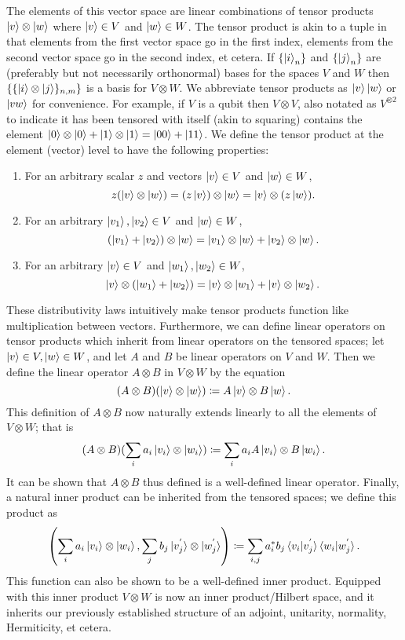 \documentclass[12pt,twoside]{reedthesis}
\theoremstyle{plain}   %
\theoremstyle{definition}
\theoremstyle{remark}
\numberwithin{equation}{section}
\begin{document}
  The elements of this vector space are linear combinations of tensor products $\ket{v} \otimes \ket{w}$
  where $\ket{v} \in V$ and $\ket{w} \in W$.
  The tensor product is akin to a tuple in that elements from the first vector space go in the first index, elements from the second vector space go in the second index, et cetera.
  If $\{\ket{i}_n \}$ and $\{\ket{j}_n \}$ are (preferably but not necessarily orthonormal) bases for the spaces $V$ and $W$ then $\{\{ \ket{i} \otimes \ket{j} \}_{n, m}\}$ is a basis for $V \otimes W$.
  We abbreviate tensor products as $\ket{v} \ket{w}$ or $\ket{vw}$ for convenience.
  For example, if $V$ is a qubit then $V \otimes V$, also notated as $V^{\otimes 2}$ to indicate it has been tensored with itself (akin to squaring) contains the element
  $\ket{0} \otimes \ket{0} + \ket{1} \otimes \ket{1} = \ket{0 0} + \ket{1 1}$.
  We define the tensor product at the element (vector) level to have the following properties:
  \begin{enumerate}
  \item For an arbitrary scalar $z$ and vectors $\ket{v} \in V$ and $\ket{w} \in W$,
    \[ z ( \ket{v} \otimes \ket{w}) = (z \ket{v}) \otimes \ket{w} = \ket{v} \otimes (z \ket{w }).\]

  \item
    For an arbitrary $\ket{v_1}, \ket{v_2} \in V$ and $\ket{w} \in W$,
    \[ (\ket{v_1} + \ket{v_2}) \otimes \ket{w} = \ket{v_1}  \otimes \ket{w} + \ket{v_2} \otimes \ket{w}. \]
  \item
    For an arbitrary $\ket{v} \in V$ and $\ket{w_1}, \ket{w_2} \in W$,
    \[ \ket{v} \otimes (\ket{w_1} + \ket{w_2})  = \ket{v}  \otimes \ket{w_1} + \ket{v} \otimes \ket{w_2}. \]
  \end{enumerate}
  These distributivity laws intuitively make tensor products function like multiplication between vectors.
  Furthermore, we can define linear operators on tensor products which inherit from linear operators on the tensored spaces;
  let $\ket{v} \in V, \ket{w} \in W$, and let $A$ and $B$ be linear operators on $V$ and $W$.
  Then we define the linear operator $A \otimes B$ in $V \otimes W$ by the equation
  \[(A \otimes B) (\ket{v} \otimes \ket{w}) \coloneq A  \ket{v} \otimes B \ket{w}.\]
  This definition of $A \otimes B$ now naturally extends linearly to all the elements of $V \otimes W$; that is
  \[(A \otimes B) (\sum_i a_i \ket{v_i} \otimes \ket{w_i}) \coloneq \sum_i a_i A\ket{v_i} \otimes B\ket{w_i}.\]
  It can be shown that $A \otimes B$ thus defined is a well-defined linear operator.
  Finally, a natural inner product can be inherited from the tensored spaces; we define this product as 
  \[ \left( \sum_i a_i \ket{v_i} \otimes \ket{w_i}, \sum_j b_j \ket{v^{'}_j} \otimes \ket{w^{'}_j}  \right) \coloneq
    \sum_{i, j} a_i^* b_j \braket{v_i  | v^{'}_j} \braket{w_i  | w^{'}_j}. \]
  This function can also be shown to be a well-defined inner product. Equipped with this inner product $V \otimes W$ is now an inner product/Hilbert space, and it inherits our previously established structure of
  an adjoint, unitarity, normality, Hermiticity, et cetera.
\end{document}
